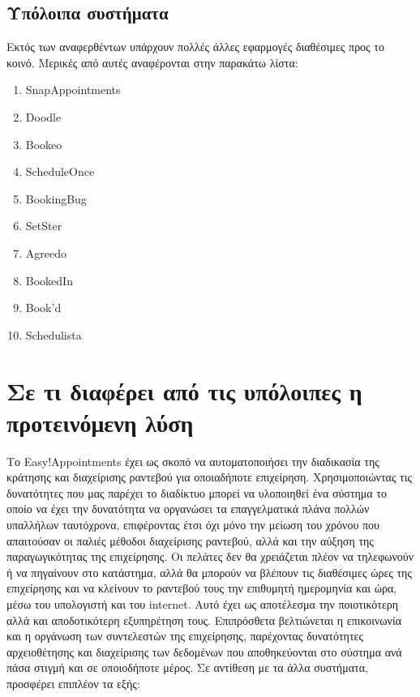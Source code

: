 \subsection{Υπόλοιπα συστήματα}
Εκτός των αναφερθέντων υπάρχουν πολλές άλλες εφαρμογές διαθέσιμες προς το κοινό. Μερικές από αυτές αναφέρονται στην παρακάτω λίστα:
\begin{enumerate}
\item SnapAppointments
\item Doodle
\item Bookeo
\item ScheduleOnce
\item BookingBug
\item SetSter
\item Agreedo
\item BookedIn
\item Book'd
\item Schedulista
\end{enumerate}

\section{Σε τι διαφέρει από τις υπόλοιπες η προτεινόμενη λύση}
Το Easy!Appointments έχει ως σκοπό να αυτοματοποιήσει την διαδικασία της κράτησης και διαχείρισης ραντεβού για οποιαδήποτε επιχείρηση. Χρησιμοποιώντας τις δυνατότητες που μας παρέχει το διαδίκτυο μπορεί να υλοποιηθεί ένα σύστημα το οποίο να έχει την δυνατότητα να οργανώσει τα επαγγελματικά πλάνα πολλών υπαλλήλων ταυτόχρονα, επιφέροντας έτσι όχι μόνο την μείωση του χρόνου που απαιτούσαν οι παλιές μέθοδοι διαχείρισης ραντεβού, αλλά και την αύξηση της παραγωγικότητας της επιχείρησης. Οι πελάτες δεν θα χρειάζεται πλέον να τηλεφωνούν ή να πηγαίνουν στο κατάστημα, αλλά θα μπορούν να βλέπουν τις διαθέσιμες ώρες της επιχείρησης και να κλείνουν το ραντεβού τους την επιθυμητή ημερομηνία και ώρα, μέσω του υπολογιστή και του internet. Αυτό έχει ως αποτέλεσμα την ποιοτικότερη αλλά και αποδοτικότερη εξυπηρέτηση τους. Επιπρόσθετα βελτιώνεται η επικοινωνία και η οργάνωση των συντελεστών της επιχείρησης, παρέχοντας δυνατότητες αρχειοθέτησης και διαχείρισης των δεδομένων που αποθηκεύονται στο σύστημα ανά πάσα στιγμή και σε οποιοδήποτε μέρος. Σε αντίθεση με τα άλλα συστήματα, προσφέρει επιπλέον τα εξής:

